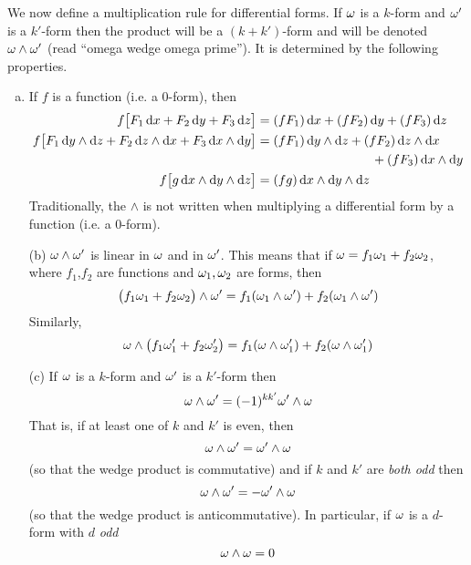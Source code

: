 \begin{defn}
             \label{def:differentialFormMult}
We now define a multiplication rule for differential forms. 
If $\omega$ is a $k$-form and $\omega'$ is a 
$k'$-form then the product will be a $(k+k')$-form and will be denoted
$\omega\wedge\omega'$ (read ``omega wedge omega prime''). It is 
determined by the following properties.
\begin{enumerate}[(a)]
\item
If $f$ is a function (i.e. a $0$-form), then
\begin{align*}
 f\big[F_1\,\mathrm{d}x + F_2\,\mathrm{d}y + F_3\,\mathrm{d}z\big]
   &= (fF_1)\,\mathrm{d}x + (fF_2)\,\mathrm{d}y + (fF_3)\,\mathrm{d}z
\\
 f\big[F_1\,\mathrm{d}y\wedge\mathrm{d}z
       + F_2\,\mathrm{d}z\wedge\mathrm{d}x 
       + F_3\,\mathrm{d}x\wedge\mathrm{d}y\big]
  &=(fF_1)\,\mathrm{d}y\wedge\mathrm{d}z
       + (fF_2)\,\mathrm{d}z\wedge\mathrm{d}x \\&\hskip1.25in
       + (fF_3)\,\mathrm{d}x\wedge\mathrm{d}y
\\
 f\big[g\,\mathrm{d}x\wedge\mathrm{d}y\wedge\mathrm{d}z\big]
   &= (fg)\,\mathrm{d}x\wedge\mathrm{d}y\wedge\mathrm{d}z
\end{align*}
Traditionally, the $\wedge$ is not written when multiplying
a differential form by a function (i.e. a $0$-form).

\item[(b)] %
$\omega\wedge\omega'$ is linear in $\omega$ and in $\omega'$. This means that
if $\omega = f_1\omega_1+f_2\omega_2$, where $f_1$,$f_2$ are 
functions and $\omega_1,\omega_2$ are forms, then
\begin{equation*}
\big(f_1\omega_1+f_2\omega_2\big)\wedge \omega'= f_1 (\omega_1\wedge\omega')
+f_2 (\omega_1\wedge\omega')
\end{equation*}
Similarly, 
\begin{equation*}
\omega\wedge\big(f_1\omega'_1+f_2\omega'_2\big)= f_1 (\omega\wedge\omega'_1)
+f_2 (\omega\wedge\omega'_1)
\end{equation*}


\item[(c)] %
If $\omega$ is a $k$-form and $\omega'$ is a  $k'$-form then \begin{equation*}
   \omega\wedge\omega'=(-1)^{kk'}\omega'\wedge\omega
\end{equation*}
That is, if at least one of $k$ and $k'$ is even, then
\begin{equation*}
\omega\wedge\omega'=\omega'\wedge\omega
\end{equation*}
(so that the wedge product is commutative) 
and if $k$ and $k'$ are \emph{both odd} then 
\begin{equation*}
\omega\wedge\omega'=-\omega'\wedge\omega
\end{equation*} 
(so that the wedge product is anticommutative).
In particular, if $\omega$ is a $d$-form with $d$ \emph{odd}
\begin{equation*}
\omega\wedge\omega = 0
\end{equation*}


\end{enumerate}
\end{defn}
